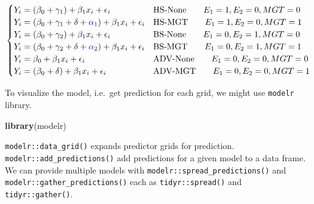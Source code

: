 \documentclass[]{book}
\newenvironment{Shaded}{\begin{snugshade}}{\end{snugshade}}
\newcommand{\KeywordTok}[1]{\textcolor[rgb]{0.13,0.29,0.53}{\textbf{#1}}}
\newcommand{\NormalTok}[1]{#1}
\theoremstyle{definition}
\theoremstyle{definition}
\theoremstyle{definition}
\theoremstyle{remark}
\begin{document}
\begin{equation}
  \begin{cases}
    Y_i = (\beta_0 + \gamma_1) + \beta_1 x_i + \epsilon_i & \text{HS-None} \qquad E_1 = 1, E_2 = 0, MGT = 0 \\
    Y_i = (\beta_0 + \gamma_1 + \delta + {\color{blue}{\alpha_1}}) + \beta_1 x_i + \epsilon_i & \text{HS-MGT} \qquad E_1 = 1, E_2 = 0, MGT = 1 \\
    Y_i = (\beta_0 + \gamma_2) + \beta_1 x_i + \epsilon_i & \text{BS-None} \qquad E_1 = 0, E_2 = 1, MGT = 0 \\
    Y_i = (\beta_0 + \gamma_2 + \delta + {\color{blue}{\alpha_2}}) + \beta_1 x_i + \epsilon_i & \text{BS-MGT} \qquad E_1 = 0, E_2 = 1, MGT = 1 \\
    Y_i = \beta_0 + \beta_1 x_i + \epsilon_i & \text{ADV-None} \qquad E_1 = 0, E_2 = 0, MGT = 0 \\
    Y_i = (\beta_0 + \delta) + \beta_1 x_i + \epsilon_i & \text{ADV-MGT} \qquad E_1 = 0, E_2 = 0, MGT = 1
  \end{cases}
  \label{eq:dummysep2}
\end{equation}

To visualize the model, i.e.~get prediction for each grid, we might use \texttt{modelr} library.

\begin{Shaded}
\begin{Highlighting}[]
\KeywordTok{library}\NormalTok{(modelr)}
\end{Highlighting}
\end{Shaded}

\texttt{modelr::data\_grid()} expands predictor grids for prediction. \texttt{modelr::add\_predictions()} add predictions for a given model to a data frame. We can provide multiple models with \texttt{modelr::spread\_predictions()} and \texttt{modelr::gather\_predictions()} each as \texttt{tidyr::spread()} and \texttt{tidyr::gather()}.
\end{document}
